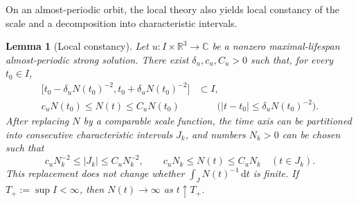 \documentclass{interact}
\numberwithin{equation}{section}
\theoremstyle{plain}
\newtheorem{lemma}[theorem]{Lemma}
\theoremstyle{definition}
\theoremstyle{remark}
\newcommand{\R}{\mathbb R}
\newcommand{\C}{\mathbb C}
\newcommand{\dd}{\,\mathrm d}
\begin{document}
On an almost-periodic orbit, the local theory also yields local constancy of the scale and a decomposition into characteristic intervals.

\begin{lemma}[Local constancy]\label{lem:local-constancy}
Let $u:I\times\R^3\to\C$ be a nonzero maximal-lifespan almost-periodic strong solution. There exist $\delta_u,c_u,C_u>0$ such that, for every $t_0\in I$,
\begin{align}
 \bigl[t_0-\delta_uN(t_0)^{-2},
 t_0+\delta_uN(t_0)^{-2}\bigr]
 &\subset I,
 \label{eq:local-lifespan-window}\\
 c_uN(t_0)\le N(t)\le C_uN(t_0)
 &\qquad\bigl(|t-t_0|\le\delta_uN(t_0)^{-2}\bigr).
 \label{eq:local-constancy}
\end{align}
After replacing $N$ by a comparable scale function, the time axis can be partitioned into consecutive characteristic intervals $J_k$, and numbers $N_k>0$ can be chosen such that
\begin{equation}\label{eq:characteristic-interval}
 c_uN_k^{-2}\le |J_k|\le C_uN_k^{-2},
 \qquad
 c_uN_k\le N(t)\le C_uN_k
 \quad(t\in J_k).
\end{equation}
This replacement does not change whether $\int_JN(t)^{-1}\dd t$ is finite. If $T_+:=\sup I<\infty$, then $N(t)\to\infty$ as $t\uparrow T_+$.
\end{lemma}
\end{document}
